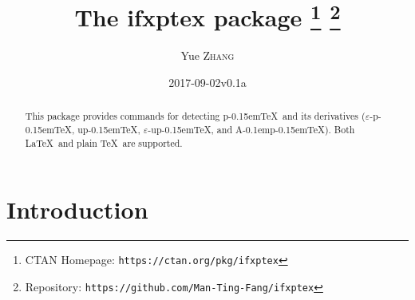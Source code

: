 \documentclass[a4paper]{article}
\newcommand\NormalSans{\normalfont\sffamily}
\newcommand\pkg[1]{{\protect\NormalSans#1}}
\newcommand\pTeX{p\kern-0.15em\TeX}
\newcommand\e{\ensuremath{\varepsilon}}
\newcommand\epTeX{\e-\pTeX}
\newcommand\upTeX{u\pTeX}
\newcommand\eupTeX{\e-\upTeX}
\newcommand\ApTeX{A\kern-0.1em\pTeX}
\begin{document}
\title{The \pkg{ifxptex} package%
  \thanks{CTAN Homepage: \texttt{https://ctan.org/pkg/ifxptex}}
  \thanks{Repository: \texttt{https://github.com/Man-Ting-Fang/ifxptex}}}
\author{Yue \textsc{Zhang}}
\date{2017-09-02\quad v0.1a}

\maketitle

\begin{abstract}
This package provides commands for detecting \pTeX\ and its derivatives (\epTeX,
\upTeX, \eupTeX, and \ApTeX). Both \LaTeX\ and plain \TeX\ are supported.
\end{abstract}

\section{Introduction}
\end{document}

